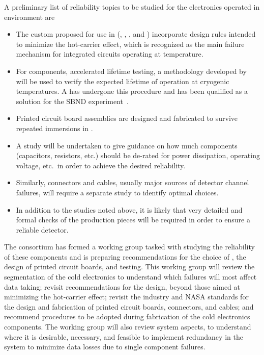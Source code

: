 A preliminary list of reliability topics to be studied for the  electronics operated 
in  environment are
\begin{itemize}
	\item The custom  proposed for use in  (, 
	, , and ) incorporate design rules 
	intended to minimize the hot-carrier effect\cite{Li:CELAr,Hoff:2015hax}, 
	which is recognized as the main failure mechanism for integrated circuits 
	operating at  temperature.
        \item For  components, accelerated lifetime testing, a methodology 
	developed by ~\cite{nasa_nepp} will be used to verify the expected
        lifetime of operation at cryogenic temperatures. A   has undergone
        this procedure and has been qualified as a solution for the SBND experiment~\cite{Chen:2018zic}.
	\item Printed circuit board assemblies are designed and fabricated to survive 
	repeated immersions in \lntwo.
        \item A study will be undertaken to give guidance on how much components (capacitors,
        resistors, etc.) should be de-rated for power dissipation, operating voltage, etc.~in
        order to achieve the desired reliability.
        \item Similarly, connectors and cables, usually major sources of detector channel failures,
        will require a separate study to identify optimal choices.
        \item In addition to the  studies noted above, it is likely that very detailed
        and formal  checks of the production pieces will be required in order to ensure
        a reliable detector.
\end{itemize}
The  consortium has formed a working group tasked with studying the reliability  
of these components and is preparing recommendations for the choice of , 
the design of printed circuit boards, and testing. This working group will review the 
segmentation of the cold electronics to understand which failures will most affect data taking; revisit recommendations for the  design, 
beyond those aimed at minimizing the hot-carrier effect; revisit the industry and 
NASA standards for the design and fabrication of printed circuit boards, connectors, 
and cables; and recommend  procedures to be adopted during 
fabrication of the cold electronics components. The working group will also review
system aspects, to understand where it is desirable, necessary, and feasible to implement 
redundancy in the system to minimize data losses due to single component failures. 
